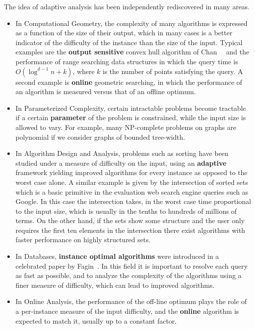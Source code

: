 The idea of adaptive analysis has been independently rediscovered in many areas. 
\begin{itemize}
\item In Computational Geometry, the complexity of many algorithms is
  expressed as a function of the size of their output, which in many
  cases is a better indicator of the difficulty of the instance than
  the size of the input.
  Typical examples are the {\bf output sensitive} convex hull
  algorithm of Chan~\etal~\cite{chan96optimal} and the performance of
  range searching data structures in which the query time is
  $O(\log^{d-1} n+k)$, where $k$ is the number of points satisfying
  the query.  
  A second example is {\bf online} geometric searching, in which the
  performance of an algorithm is measured versus that of an offline
  optimum.

\item In Parameterized Complexity, certain intractable problems become
  tractable if a certain {\bf parameter} of the problem is
  constrained, while the input size is allowed to vary.
  For example, many NP-complete problems on graphs are polynomial if
  we consider graphs of bounded tree-width.

\item In Algorithm Design and Analysis, problems such as sorting have
  been studied under a measure of difficulty on the input, using an
  {\bf adaptive} framework yielding improved algorithms for every
  instance as opposed to the worst case alone.
  A similar example is given by the intersection of sorted sets which
  is a basic primitive in the evaluation web search engine queries
  such as Google.
  In this case the intersection takes, in the worst case time
  proportional to the input size, which is usually in the tenths to
  hundreds of millions of terms.
  On the other hand, if the sets show some structure and the user only
  requires the first ten elements in the intersection there exist
  algorithms with faster performance on highly structured sets.

\item In Databases, {\bf instance optimal algorithms} were introduced
  in a celebrated paper by Fagin~\etal. 
  In this field it is important to resolve each query as fast as
  possible, and to analyze the complexity of the algorithms using a
  finer measure of difficulty, which can lead to improved algorithms.

\item In Online Analysis, the performance of the off-line optimum
  plays the role of a per-instance measure of the input difficulty,
  and the {\bf online} algorithm is expected to match it, usually up
  to a constant factor.


\end{itemize}
